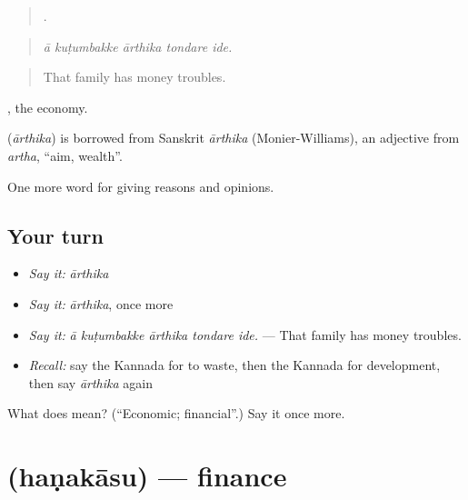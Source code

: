 \begin{quote}
    .
\end{quote}

\begin{quote}
\emph{ā kuṭumbakke ārthika tondare ide.}
\end{quote}

\begin{quote}
That family has money troubles.
\end{quote}

, the economy.

\begin{cousinweb}
\textbf{} (\emph{ārthika}) is borrowed from Sanskrit \emph{ārthika} (Monier-Williams), an adjective from \emph{artha}, \textquotedblleft{}aim, wealth\textquotedblright{}.
\end{cousinweb}

\begin{grammarlens}[title={What you've built}]
One more word for giving reasons and opinions.
\end{grammarlens}

\subsection*{Your turn}
\begin{itemize}
\raggedright
  \item \emph{Say it:} \emph{ārthika}
  \item \emph{Say it:} \emph{ārthika}, once more
  \item \emph{Say it:} \emph{ā kuṭumbakke ārthika tondare ide.} — That family has money troubles.
  \item \emph{Recall:} say the Kannada for to waste, then the Kannada for development, then say \emph{ārthika} again
\end{itemize}

\begin{tcolorbox}[breakable,colback=teal!4,colframe=teal!35!black,title={Before you move on}]
What does  mean? (\textquotedblleft{}Economic; financial\textquotedblright{}.) Say it once more.
\end{tcolorbox}
\section[\texorpdfstring{\kn{ಹಣಕಾಸು} (haṇakāsu)}{ಹಣಕಾಸು (haṇakāsu)}]{ (haṇakāsu) — finance}

